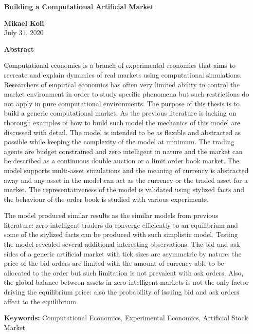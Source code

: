 \thispagestyle{plain}
\begin{center}
    \Large
    \textbf{Building a Computational Artificial Market}
        
    \vspace{0.4cm}
    \large
        
    \vspace{0.4cm}
    \textbf{Mikael Koli} \\
    July 31, 2020 %
       
    \vspace{0.9cm}
    \textbf{Abstract}
\end{center}

Computational economics is a branch of experimental economics that aims to 
recreate and explain dynamics of real markets using computational simulations. Researchers of
empirical economics has often very limited ability to control the market environment 
in order to study specific phenomena but such restrictions do not apply in pure computational
environments. The purpose of this thesis is to build a generic computational market. As the
previous literature is lacking on thorough examples of how to build such model the mechanics of this
model are discussed with detail. The model is intended to be as flexible and abstracted as possible 
while keeping the complexity of the model at minimum. The trading agents are budget constrained 
and zero intelligent in nature and the market can be described as a continuous double auction or a 
limit order book market. The model supports multi-asset simulations and the meaning of currency is 
abstracted away and any asset in the model can act as the currency or the traded asset for a market. 
The representativeness of the model is validated using stylized facts and the behaviour
of the order book is studied with various experiments.

The model produced similar results as the similar models from previous literature: zero-intelligent
traders do converge efficiently to an equilibrium and some of the stylized facts can be produced
with such simplistic model. Testing the model revealed several additional interesting observations.
The bid and ask sides of a generic artificial market with tick sizes are asymmetric by nature: the 
price of the bid orders are limited with the amount of currency able to be allocated to the order 
but such limitation is not prevalent with ask orders. Also, the global balance between assets in 
zero-intelligent markets is not the only factor driving the equilibrium price: also the probability 
of issuing bid and ask orders affect to the equilibrium.

\textbf{Keywords:} Computational Economics, Experimental Economics, Artificial Stock Market
